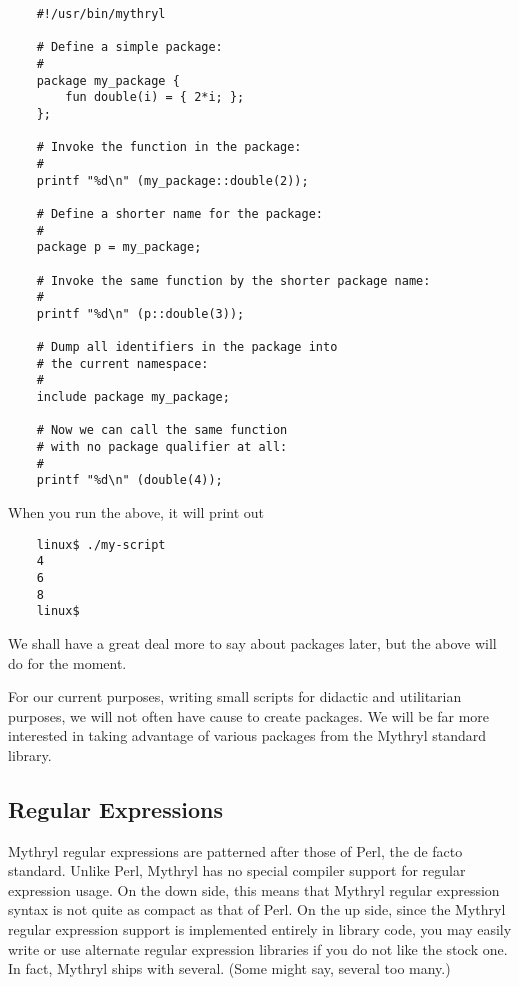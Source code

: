 \begin{verbatim}
    #!/usr/bin/mythryl

    # Define a simple package:
    #
    package my_package {
        fun double(i) = { 2*i; };
    };

    # Invoke the function in the package:
    #
    printf "%d\n" (my_package::double(2));

    # Define a shorter name for the package:
    #
    package p = my_package;

    # Invoke the same function by the shorter package name:
    #
    printf "%d\n" (p::double(3));

    # Dump all identifiers in the package into
    # the current namespace:
    #
    include package my_package;

    # Now we can call the same function
    # with no package qualifier at all:
    #
    printf "%d\n" (double(4));
\end{verbatim}

When you run the above, it will print out

\begin{verbatim}
    linux$ ./my-script
    4
    6
    8
    linux$
\end{verbatim}

We shall have a great deal more to say about packages later, 
but the above will do for the moment.

For our current purposes, writing small scripts for didactic and 
utilitarian purposes, we will not often have cause to create packages. 
We will be far more interested in taking advantage of various packages 
from the Mythryl standard library.


\cutend*

\subsection{Regular Expressions}
\label{section:tut:bare-essentials:regex}

Mythryl regular expressions are patterned after those of Perl, the 
de facto standard.  Unlike Perl, Mythryl has no special compiler 
support for regular expression usage.  On the down side, this means 
that Mythryl regular expression syntax is not quite as compact as 
that of Perl.  On the up side, since the Mythryl regular expression support 
is implemented entirely in library code, you may easily write or use 
alternate regular expression libraries if you do not like the stock one. 
In fact, Mythryl ships with several.  (Some might say, several too many.) 

